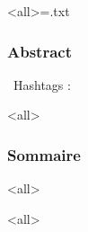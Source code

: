 \documentclass[ignorenonframetext,9pt,allowframebreaks,aspectratio=169]{beamer}
\title{\utitle}
\subtitle{\ushorttitle}
\author{\uauthor}
\institute[\uinstituteshort]{{\uinstitute \\ \uchaire}}
\institute{\uinstituteshort}
\begin{document}
\mode<all>{\immediate\openout\audioexport=\jobname.txt}

\begin{frame}[plain]
\titlepage
\end{frame}


\begin{frame}
	\frametitle{Abstract}
	\begin{techworkin} [righthand width=.6\textwidth]{\faCogs~\small {Hashtags} : \ukeywords}\large\uabstract
	\end{techworkin}
	\end{frame}



\mode<all>{}


\begin{frame}
  \frametitle{Sommaire}
  \begin{multicols}{2}
  \tableofcontents
  \end{multicols}
  \end{frame}

\mode<all>{\ubody}

\mode<all>{}
\end{document}
